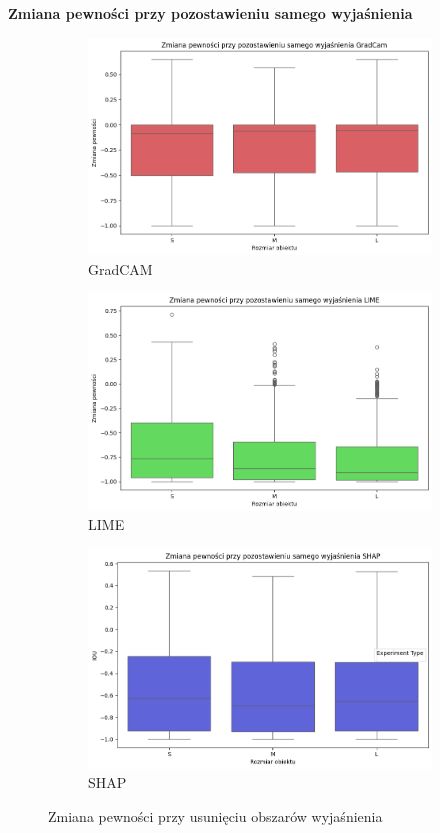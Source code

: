 \textbf{Zmiana pewności przy pozostawieniu samego wyjaśnienia}
\begin{figure}[h]
	\centering
	\begin{subfigure}[b]{0.3\textwidth}
		\centering\includegraphics[width=.9\textwidth]{img/size_confidence_exp_gradcam}
		\caption{GradCAM}  \label{rys:size_confidence_mask_gradcam}
	\end{subfigure}
	\begin{subfigure}[b]{0.3\textwidth}
		\centering\includegraphics[width=.9\textwidth]{img/size_confidence_exp_lime}
		\caption{LIME}  \label{rys:size_confidence_mask_lime}
	\end{subfigure}
	\begin{subfigure}[b]{0.3\textwidth}
		\centering\includegraphics[width=.9\textwidth]{img/size_confidence_exp_shap}
		\caption{SHAP}  \label{rys:size_confidence_mask_shap}
	\end{subfigure}
	\caption{Zmiana pewności przy usunięciu obszarów wyjaśnienia}
	\label{rys:size_confidence_exp}
\end{figure}

